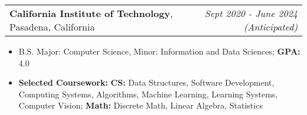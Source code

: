 \documentclass[letterpaper,11pt]{article}
\makeatletter
\newcommand{\resitem}[1]{\item[--] #1 \vspace{-8pt}}
\newcommand{\edusubheading}[3]{
	\begin{tabular*}{7.5in}{l@{\extracolsep{\fill}}r}
		\textbf{#1}, #2 & \textit{#3} \\
	\end{tabular*}
	\vspace{-16pt}}
\newcommand{\myitem}[1]{\item[--] #1 \vspace{-8pt}}
\newcommand{\mysubitem}[1]{\item #1 \vspace{-4pt}}
\makeatother
\begin{document}

\edusubheading{California Institute of Technology}{Pasadena, California}{Sept 2020 - June 2024 (Anticipated)}
	\begin{itemize}[leftmargin=*]
		\resitem{B.S. Major: Computer Science, Minor: Information and Data Sciences; \textbf{GPA:} 4.0}
		\resitem{\textbf{Selected Coursework:} \textbf{CS:} Data Structures, Software Development, Computing Systems, Algorithms, Machine Learning, Learning Systems, Computer Vision; \textbf{Math:} Discrete Math, Linear Algebra, Statistics}
	\end{itemize}

\end{document}
